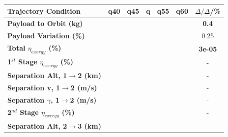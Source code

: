 \begin{table}[ht]
\centering
\begin{tabular}{l c c c c c c} 
	\hline \textbf{Trajectory Condition}
	&q40
	&q45
	&q
	&q55
	&q60
	& $\Delta/\Delta$/\%
	\\
	\hline \textbf{Payload to Orbit (kg)}
	& \textbf{\PayloadToOrbitqForty}
	& \textbf{\PayloadToOrbitqFortyFive}
	& \textbf{\PayloadToOrbitqStandard}
	& \textbf{\PayloadToOrbitqFiftyFive}
	& \textbf{\PayloadToOrbitqSixty}
	&\textbf{0.4}
	\\
	\textbf{Payload Variation (\%)}
	& \PayloadVarqForty
	& \PayloadVarqFortyFive
	& \PayloadVarqStandard
	& \PayloadVarqFiftyFive
	& \PayloadVarqSixty
	&0.25
	\\
	\textbf{Total $\eta_{exergy}$ (\%)}
	& \textbf{\totalExergyEffqForty}
	& \textbf{\totalExergyEffqFortyFive}
	& \textbf{\totalExergyEffqStandard}
	& \textbf{\totalExergyEffqFiftyFive}
	& \textbf{\totalExergyEffqSixty}
	& \textbf{3e-05}
	\\
	\hline 
	\textbf{1$^{st}$ Stage $\eta_{exergy}$ (\%)}
	& \textbf{\firstExergyEffqForty}
	& \textbf{\firstExergyEffqFortyFive}
	& \textbf{\firstExergyEffqStandard}
	& \textbf{\firstExergyEffqFiftyFive}
	& \textbf{\firstExergyEffqSixty}
	& -
	\\
	\textbf{Separation Alt, 1$\rightarrow$2 (km)}
	& \firstsecondSeparationAltqForty
	& \firstsecondSeparationAltqFortyFive
	& \firstsecondSeparationAltqStandard
	& \firstsecondSeparationAltqFiftyFive
	& \firstsecondSeparationAltqSixty
	& -
	\\
	\textbf{Separation v, 1$\rightarrow$2 (m/s)}
	& \firstsecondSeparationvqForty
	& \firstsecondSeparationvqFortyFive
	& \firstsecondSeparationvqStandard
	& \firstsecondSeparationvqFiftyFive
	& \firstsecondSeparationvqSixty
	& -
	\\
	\textbf{Separation $\gamma$, 1$\rightarrow$2 (m/s)}
	& \firstsecondSeparationgammaqForty
	& \firstsecondSeparationgammaqFortyFive
	& \firstsecondSeparationgammaqStandard
	& \firstsecondSeparationgammaqFiftyFive
	& \firstsecondSeparationgammaqSixty
	& -
	\\
	\hline 
	\textbf{2$^{nd}$ Stage $\eta_{exergy}$ (\%)}
	& \textbf{\secondExergyEffqForty}
	& \textbf{\secondExergyEffqFortyFive}
	& \textbf{\secondExergyEffqStandard}
	& \textbf{\secondExergyEffqFiftyFive}
	& \textbf{\secondExergyEffqSixty}
	& -
	\\
	\textbf{Separation Alt, 2$\rightarrow$3 (km)}
	& \secondthirdSeparationAltqForty
	& \secondthirdSeparationAltqFortyFive
	& \secondthirdSeparationAltqStandard

\end{tabular}
\end{table}

